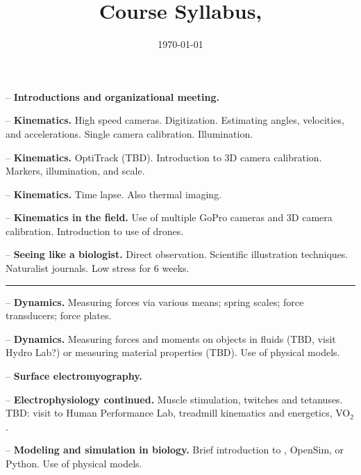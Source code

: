 \documentclass{exam}
\title{Course Syllabus, \usnaCourseTerm}
\author{\usnaInstructorShort}
\date{\today}
\begin{document}
\maketitle

\begin{questions}
\question \printdate{\courseWeekOne} -- \textbf{Introductions and organizational meeting.}

\question \printdate{\courseWeekTwo} -- \textbf{Kinematics.} High speed cameras. Digitization. Estimating angles, velocities, and accelerations. Single camera calibration. Illumination. 

\question \printdate{\courseWeekThree} -- \textbf{Kinematics.} OptiTrack (TBD). Introduction to 3D camera calibration. Markers, illumination, and scale. 

\question \printdate{\courseWeekFour} -- \textbf{Kinematics.} Time lapse. Also thermal imaging. 

\question \printdate{\courseWeekFive} -- \textbf{Kinematics in the field.} Use of multiple GoPro cameras and 3D camera calibration. Introduction to use of drones. 

\question \printdate{\courseWeekSix} -- \textbf{Seeing like a biologist.} Direct observation. Scientific illustration techniques. Naturalist journals. Low stress for 6 weeks. 

\vspace{1em}
\hrule
\vspace{1em}

\question \printdate{\courseWeekSeven} -- \textbf{Dynamics.} Measuring forces via various means; spring scales; force transducers; force plates.

\question \printdate{\courseWeekEight} -- \textbf{Dynamics.} Measuring forces and moments on objects in fluids (TBD, visit Hydro Lab?) or measuring material properties (TBD). Use of physical models. 

\question \printdate{\courseWeekNine} -- \textbf{Surface electromyography.} 

\question \printdate{\courseWeekTen} -- \textbf{Electrophysiology continued.} Muscle stimulation, twitches and tetanuses. TBD: visit to Human Performance Lab, treadmill kinematics and energetics, VO$_2$. 

\question \printdate{\courseWeekEleven} -- \textbf{Modeling and simulation in biology.} Brief introduction to \Matlab, OpenSim, or Python. Use of physical models. 


\end{questions}
\end{document}
